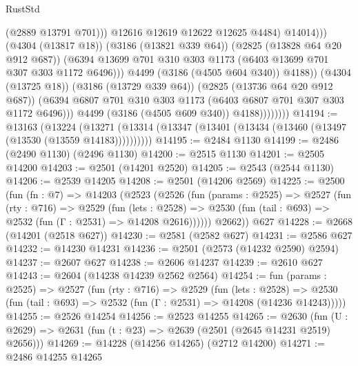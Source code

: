 \begin{lexlean}{RustStd}
\begin{coremodule}
{\begin{coremodule}
{{{{{{{{{{{{{{{{{{{{                                        (@2889 @13791 @701)))
                                    @12616
                                    @12619
                                    @12622
                                    @12625
                                    @4484)
                                  @14014)))
                            (@4304 (@13817 @18))
                            (@3186 (@13821 @339 @64))
                            (@2825 (@13828 @64 @20 @912 @687))
                            (@6394
                              @13699
                              @701
                              @310
                              @303
                              @1173
                              (@6403 @13699 @701 @307 @303 @1172 @6496)))
                          @4499
                          (@3186 (@4505 @604 @340))
                          @4188))
                      (@4304 (@13725 @18))
                      (@3186 (@13729 @339 @64))
                      (@2825 (@13736 @64 @20 @912 @687))
                      (@6394 @6807 @701 @310 @303 @1173 (@6403 @6807 @701 @307 @303 @1172 @6496)))
                    @4499
                    (@3186 (@4505 @609 @340))
                    @4188))))))))
@14194 := @13163
    (@13224 (@13271 (@13314 (@13347 (@13401 (@13434 (@13460 (@13497 (@13530 (@13559 @14183))))))))))
@14195 := @2484 @1130
@14199 := @2486 (@2490 @1130) (@2496 @1130)
@14200 := @2515 @1130
@14201 := @2505 @14200
@14203 := @2501 (@14201 @2520)
@14205 := @2543 (@2544 @1130)
@14206 := @2539 @14205
@14208 := @2501 (@14206 @2569)
@14225 := @2500
    (fun (fn : @7) =>
    @14203
      (@2523
        (@2526
          (fun (params : @2525) =>
          @2527
            (fun (rty : @716) =>
            @2529
              (fun (lets : @2528) =>
              @2530 (fun (tail : @693) => @2532 (fun (Γ : @2531) => @14208 @2616))))))
        @2662))
    @627
@14228 := @2668 (@14201 (@2518 @627))
@14230 := @2581 (@2582 @627)
@14231 := @2586 @627
@14232 := @14230 @14231
@14236 := @2501 (@2573 (@14232 @2590) @2594)
@14237 := @2607 @627
@14238 := @2606 @14237
@14239 := @2610 @627
@14243 := @2604 (@14238 @14239 @2562 @2564)
@14254 := fun (params : @2525) =>
  @2527
    (fun (rty : @716) =>
    @2529
      (fun (lets : @2528) =>
      @2530 (fun (tail : @693) => @2532 (fun (Γ : @2531) => @14208 (@14236 @14243)))))
@14255 := @2526 @14254
@14256 := @2523 @14255
@14265 := @2630
    (fun (U : @2629) => @2631 (fun (t : @23) => @2639 (@2501 (@2645 @14231 @2519) @2656)))
@14269 := @14228 (@14256 @14265) (@2712 @14200)
@14271 := @2486 @14255 @14265
}}}}}}}}}}}}}}}}}}}}
\end{coremodule}}
\end{coremodule}
\end{lexlean}

